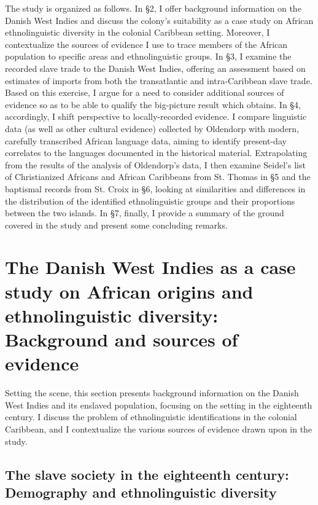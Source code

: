 \documentclass[output=paper,colorlinks,citecolor=brown]{langscibook}
\begin{document}
The study is organized as follows. In §2, I offer background information on the Danish West Indies and discuss the colony’s suitability as a case study on African ethnolinguistic diversity in the colonial Caribbean setting. Moreover, I contextualize the sources of evidence I use to trace members of the African population to specific areas and ethnolinguistic groups. In §3, I examine the recorded slave trade to the Danish West Indies, offering an assessment based on estimates of imports from both the transatlantic and intra-Caribbean slave trade. Based on this exercise, I argue for a need to consider additional sources of evidence so as to be able to qualify the big-picture result which obtains. In §4, accordingly, I shift perspective to locally-recorded evidence. I compare linguistic data (as well as other cultural evidence) collected by Oldendorp with modern, carefully transcribed African language data, aiming to identify present-day correlates to the languages documented in the historical material. Extrapolating from the results of the analysis of Oldendorp’s data, I then examine Seidel’s list of Christianized Africans and African Caribbeans from St. Thomas in §5 and the baptismal records from St. Croix in §6, looking at similarities and differences in the distribution of the identified ethnolinguistic groups and their proportions between the two islands. In §7, finally, I provide a summary of the ground covered in the study and present some concluding remarks.

\section{The Danish West Indies as a case study on African origins and ethnolinguistic diversity: Background and sources of evidence}

Setting the scene, this section presents background information on the Danish West Indies and its enslaved population, focusing on the setting in the eighteenth century. I discuss the problem of ethnolinguistic identifications in the colonial Caribbean, and I contextualize the various sources of evidence drawn upon in the study.

\subsection{The slave society in the eighteenth century: Demography and ethnolinguistic diversity}
\end{document}

